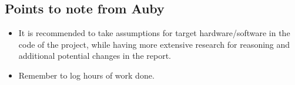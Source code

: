 \documentclass[12pt]{article}
\begin{document}
\subsection*{Points to note from Auby}
\begin{itemize}
\item It is recommended to take assumptions for target hardware/software in the code of the project, while having more extensive research for reasoning and additional potential changes in the report.
\item Remember to log hours of work done.
\end{itemize}
\end{document}

